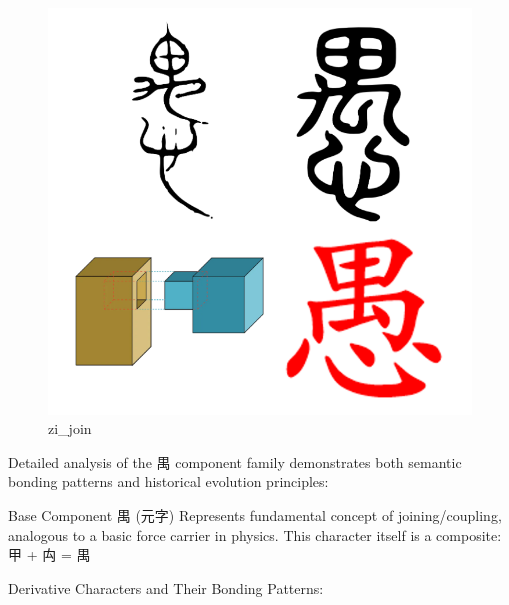 \documentclass[
  11pt,
  letterpaper,
]{article}
\begin{document}
\begin{figure}
\centering
\includegraphics{./images/zi_join.png}
\caption{zi\_join}
\end{figure}

Detailed analysis of the 禺 component family demonstrates both semantic
bonding patterns and historical evolution principles:

Base Component 禺 (元字) Represents fundamental concept of
joining/coupling, analogous to a basic force carrier in physics. This
character itself is a composite: 甲 + 禸 = 禺

Derivative Characters and Their Bonding Patterns:
\end{document}
